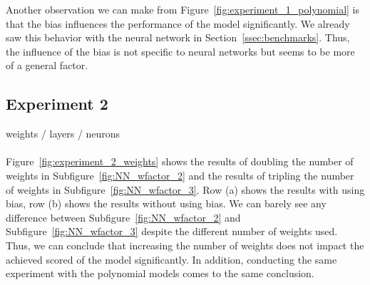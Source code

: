 Another observation we can make from Figure~\ref{fig:experiment_1_polynomial} is that the bias influences the performance of the model significantly. We already saw this behavior with the neural network in Section~\ref{ssec:benchmarks}. Thus, the influence of the bias is not specific to neural networks but seems to be more of a general factor.


\subsection{Experiment 2}
weights / layers / neurons \\ \\
Figure~\ref{fig:experiment_2_weights} shows the results of doubling the number of weights in Subfigure~\ref{fig:NN_wfactor_2} and the results of tripling the number of weights in Subfigure~\ref{fig:NN_wfactor_3}. Row (a) shows the results with using bias, row (b) shows the results without using bias. We can barely see any difference between Subfigure~\ref{fig:NN_wfactor_2} and Subfigure~\ref{fig:NN_wfactor_3} despite the different number of weights used. Thus, we can conclude that increasing the number of weights does not impact the achieved scored of the model significantly. In addition, conducting the same experiment with the polynomial models comes to the same conclusion.
